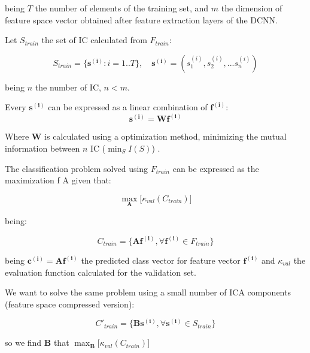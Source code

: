 being $T$ the number of elements of the training set, and $m$ the dimension of feature space vector obtained after feature extraction layers of the DCNN.

Let $S_{train}$ the set of IC calculated from $F_{train}$:

\begin{equation}
S_{train} = \{\boldsymbol{s^{(i)}} : i = 1 .. T\}, \quad \boldsymbol{s^{(i)}} = (s^{(i)}_1, s^{(i)}_2, ... s^{(i)}_n)
\end{equation}

being $n$ the number of IC, $n < m$.

Every $\boldsymbol{s^{(i)}}$ can be expressed as a linear combination of $\boldsymbol{f^{(i)}}$:
\begin{equation}
\boldsymbol{s^{(i)}} = \boldsymbol{W} \boldsymbol{f^{(i)}}
\end{equation}

Where $\boldsymbol{W}$ is calculated using a optimization method, minimizing the mutual information between $n$ IC ($\min_{S} I(S)$) \citep{hyvarinen1999fast}.

The classification problem solved using $F_{train}$ can be expressed as the maximization f A given that:

\begin{equation}
\max_{\boldsymbol{A}} \big[ \kappa_{val} (C_{train}) \big]
\end{equation}

being:

\begin{equation}
C_{train} = \{ \boldsymbol{A} \boldsymbol{f^{(i)}}, \forall \boldsymbol{f^{(i)}} \in F_{train} \} 
\end{equation}

being $\boldsymbol{c^{(i)}} = \boldsymbol{A} \boldsymbol{f^{(i)}}$ the predicted class vector for feature vector $\boldsymbol{f^{(i)}}$ and $\kappa_{val}$ the evaluation function calculated for the validation set.

We want to solve the same problem using a small number of ICA components (feature space compressed version):

\begin{equation}
C'_{train} = \{ \boldsymbol{B} \boldsymbol{s^{(i)}}, \forall \boldsymbol{s^{(i)}} \in S_{train} \} 
\end{equation}

so we find $\boldsymbol{B}$ that $\max_{\boldsymbol{B}} \big[ \kappa_{val} (C_{train}) \big]$

